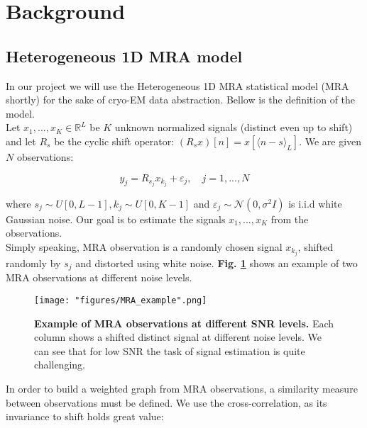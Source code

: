 \center

\section{Background}

\raggedright

\subsection{Heterogeneous 1D \acrlong{MRA} model}

In our project we will use the Heterogeneous 1D \acrlong{MRA} statistical model\cite{boumal2018heterogeneous} (\acrshort{MRA} shortly) for the sake of \acrshort{cryo-EM} data abstraction. Bellow is the definition of the model.\\
Let $x_1,...,x_K \in \mathbb{R}^L$ be $K$ unknown normalized signals (distinct even up to shift) and let $R_s$ be the cyclic shift operator: $(R_sx)[n]=x[\langle n-s \rangle_L]$. We are given $N$ observations:

\begin{equation}
\label{eqn:MRA_obs}
y_j = R_{s_j} x_{k_j} + \varepsilon_j, \quad j=1,...,N
\end{equation}

where $s_j \sim U[0, L-1],k_j \sim U[0, K-1]$ and $\varepsilon_j \sim \mathcal{N}(0,\sigma^2I)$ is i.i.d white Gaussian noise. Our goal is to estimate the signals 
$x_1,...,x_K$ from the observations.\\
Simply speaking, \acrshort{MRA} observation is a randomly chosen signal $x_{k_j}$, shifted randomly by $s_j$ and distorted using white noise. \textbf{Fig.  \ref{fig:MRA_exmp}} shows an example of two \acrshort{MRA} observations at different noise levels.

\begin{figure}[h]
  \centering
  \texttt{[image: "figures/MRA\_example".png]}
  \caption{\textbf{Example of \acrshort{MRA} observations at different SNR levels.} Each column shows a shifted distinct signal at different noise levels. We can see that for low \acrshort{SNR} the task of signal estimation is quite challenging.}
  \label{fig:MRA_exmp}
\end{figure}

In order to build a weighted graph from \acrshort{MRA} observations, a similarity measure between observations must be defined. We use the cross-correlation, as its invariance to shift holds great value:

